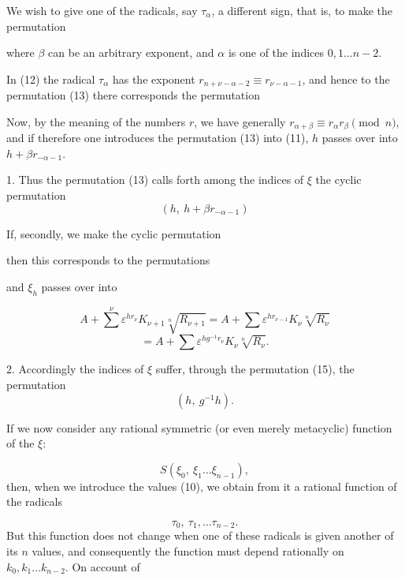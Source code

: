 We wish to give one of the radicals, say $\tau_\alpha$, a different sign, that is, to make the permutation

where $\beta$ can be an arbitrary exponent, and $\alpha$ is one of the indices $0, 1 \ldots n-2$.

In (12) the radical $\tau_\alpha$ has the exponent $r_{n+\nu-\alpha-2} \equiv r_{\nu-\alpha-1}$, and hence to the permutation (13) there corresponds the permutation

Now, by the meaning of the numbers $r$, we have generally $r_{\alpha+\beta} \equiv r_\alpha r_\beta \pmod{n}$, and if therefore one introduces the permutation (13) into (11), $h$ passes over into $h + \beta r_{-\alpha-1}$.

1. Thus the permutation (13) calls forth among the indices of $\xi$ the cyclic permutation
\[
(h,\ h + \beta r_{-\alpha-1})
\]

If, secondly, we make the cyclic permutation

then this corresponds to the permutations

and $\xi_h$ passes over into

\[
A + \sum^{\nu} \varepsilon^{h r_\nu} K_{\nu+1} \sqrt[n]{R_{\nu+1}} = A + \sum \varepsilon^{h r_{\nu-1}} K_\nu \sqrt[n]{R_\nu}
\]
\[
= A + \sum \varepsilon^{h g^{-1} r_\nu} K_\nu \sqrt[n]{R_\nu}.
\]

2. Accordingly the indices of $\xi$ suffer, through the permutation (15), the permutation
\[
(h,\ g^{-1} h).
\]

If we now consider any rational symmetric (or even merely metacyclic) function of the $\xi$:

\[
S(\xi_0,\ \xi_1 \ldots \xi_{n-1}),
\]
then, when we introduce the values (10), we obtain from it a rational function of the radicals

\[
\tau_0,\ \tau_1, \ldots \tau_{n-2}.
\]
But this function does not change when one of these radicals is given another of its $n$ values, and consequently the function must depend rationally on $k_0, k_1 \ldots k_{n-2}$. On account of
